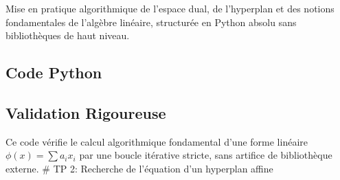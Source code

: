Mise en pratique algorithmique de l'espace dual, de l'hyperplan et des
notions fondamentales de l'algèbre linéaire, structurée en Python absolu
sans bibliothèques de haut niveau.

\hypertarget{code-python}{%
\subsection{Code Python}\label{code-python}}

\begin{Shaded}
\begin{Highlighting}[]
     \OperatorTok{!=} 
         \NormalTok{(}\NormalTok{)}

\OperatorTok{=} 
     \NormalTok{(}
\OperatorTok{+=}\OperatorTok{*}

\NormalTok{ apply\_linear\_form([}\NormalTok{, }\OperatorTok{{-}}\NormalTok{, }\NormalTok{], [}\NormalTok{, }\NormalTok{, }\NormalTok{]) }\OperatorTok{==} 
\NormalTok{ apply\_linear\_form([}\NormalTok{, }\NormalTok{], [}\NormalTok{, }\NormalTok{]) }\OperatorTok{==} 
\end{Highlighting}
\end{Shaded}

\hypertarget{validation-rigoureuse}{%
\subsection{Validation Rigoureuse}\label{validation-rigoureuse}}

Ce code vérifie le calcul algorithmique fondamental d'une forme linéaire
\(\phi(x) = \sum a_i x_i\) par une boucle itérative stricte, sans
artifice de bibliothèque externe. \# TP 2: Recherche de l'équation d'un
hyperplan affine

